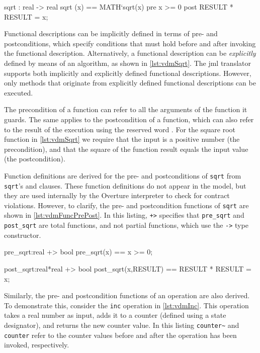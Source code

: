 \begin{vdmsl}[style=customVdm,caption={\ac{vdmsl} function for
calculating the square root of a number.},label={lst:vdmSqrt}]
sqrt :  real -> real
sqrt (x) == MATH`sqrt(x)
pre x >= 0
post RESULT * RESULT = x;
\end{vdmsl}

Functional descriptions can be implicitly defined in terms of pre- and
postconditions, which specify conditions that must hold before and
after invoking the functional description. Alternatively, a functional
description can be \emph{explicitly} defined by means of an algorithm,
as shown in \autoref{lst:vdmSqrt}. The \ac{jml} translator supports
both implicitly and explicitly defined functional
descriptions. However, only methods that originate from explicitly
defined functional descriptions can be executed.

The precondition of a function can refer to all the arguments of the
function it guards. The same applies to the postcondition of a
function, which can also refer to the result of the execution using
the reserved word . For the square root function in
\autoref{lst:vdmSqrt} we require that the input is a positive number
(the precondition), and that the square of the function result equals
the input value (the postcondition).

Function definitions are derived for the pre- and postconditions of
\texttt{sqrt} from \texttt{sqrt}'s  and 
clauses. These function definitions do not appear in the model, but
they are used internally by the Overture interpreter to check for
contract violations. However, to clarify, the pre- and postcondition
functions of \texttt{sqrt} are shown in
\autoref{lst:vdmFuncPrePost}. In this listing, \texttt{+>} specifies
that \texttt{pre\_sqrt} and \texttt{post\_sqrt} are total functions,
and not partial functions, which use the \texttt{->} type constructor.

\begin{vdmsl}[style=customVdm,caption={Pre- and postcondition
functions for the \texttt{sqrt} function shown in
\autoref{lst:vdmSqrt}.},label={lst:vdmFuncPrePost}]
pre_sqrt:real +> bool
pre_sqrt(x) == x >= 0;

post_sqrt:real*real +> bool
post_sqrt(x,RESULT) == RESULT * RESULT = x;
\end{vdmsl}

Similarly, the pre- and postcondition functions of an operation are
also derived. To demonstrate this, consider the \texttt{inc} operation
in \autoref{lst:vdmInc}. This operation takes a real number as input,
adds it to a counter (defined using a state designator), and returns
the new counter value. In this listing \texttt{counter\~} and
\texttt{counter} refer to the counter values before and after the
operation has been invoked, respectively.

